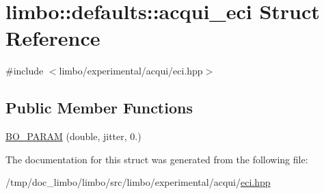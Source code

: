 \hypertarget{structlimbo_1_1defaults_1_1acqui__eci}{}\section{limbo\+:\+:defaults\+:\+:acqui\+\_\+eci Struct Reference}
\label{structlimbo_1_1defaults_1_1acqui__eci}


{\ttfamily \#include $<$limbo/experimental/acqui/eci.\+hpp$>$}

\subsection*{Public Member Functions}
\begin{DoxyCompactItemize}
\item 
\hyperlink{group__acqui__defaults_ga810b64e9658f27a5cf32463957599b69}{B\+O\+\_\+\+P\+A\+R\+AM} (double, jitter, 0.)
\end{DoxyCompactItemize}


The documentation for this struct was generated from the following file\+:\begin{DoxyCompactItemize}
\item 
/tmp/doc\+\_\+limbo/limbo/src/limbo/experimental/acqui/\hyperlink{eci_8hpp}{eci.\+hpp}\end{DoxyCompactItemize}
